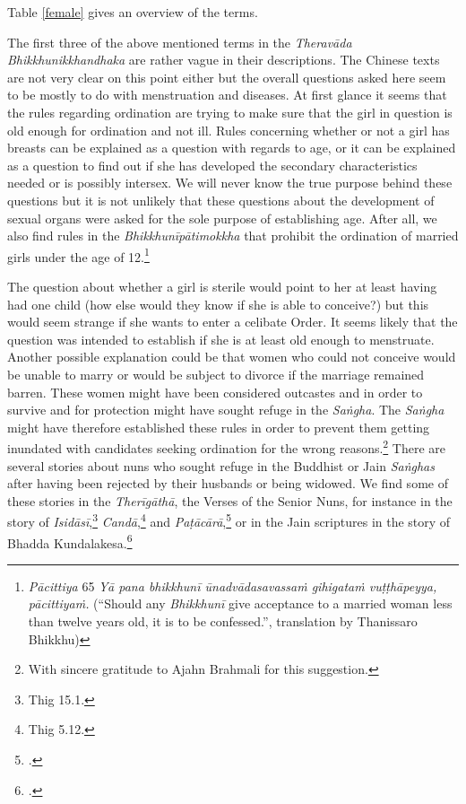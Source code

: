 Table \ref{female} gives an overview of the terms.

The first three of the above mentioned terms in the \textit{Theravāda} \textit{Bhikkhunikkhandhaka} are rather vague in their descriptions. The Chinese texts are not very clear on this point either but the overall questions asked here seem to be mostly to do with menstruation and diseases. At first glance it seems that the rules regarding ordination are trying to make sure that the girl in question is old enough for ordination and not ill. Rules concerning whether or not a girl has breasts can be explained as a question with regards to age, or it can be explained as a question to find out if she has developed the secondary characteristics needed or is possibly intersex. We will never know the true purpose behind these questions but it is not unlikely that these questions about the development of sexual organs were asked for the sole purpose of establishing age. After all, we also find rules in the \textit{Bhikkhunīpātimokkha} that prohibit the ordination of married girls under the age of 12.\footnote{\textit{Pācittiya} 65 \textit{Yā pana bhikkhunī ūnad­vāda­sa­vassaṁ gihigataṁ vuṭṭhāpeyya, pācittiyaṁ.} (``Should any \textit{Bhikkhunī} give acceptance to a married woman less than twelve years old, it is to be confessed.'', translation by Thanissaro Bhikkhu)} 

The question about whether a girl is sterile would point to her at least having had one child (how else would they know if she is able to conceive?) but this would seem strange if she wants to enter a celibate Order. It seems likely that the question was intended to establish if she is at least old enough to menstruate. Another possible explanation could be that women who could not conceive would be unable to marry or would be subject to divorce if the marriage remained barren. These women might have been considered outcastes and in order to survive and for protection might have sought refuge in the \textit{Saṅgha}. The \textit{Saṅgha} might have therefore established these rules in order to prevent them getting inundated with candidates seeking ordination for the wrong reasons.\footnote{With sincere gratitude to Ajahn Brahmali for this suggestion.} There are several stories about nuns who sought refuge in the Buddhist or Jain \textit{Saṅghas} after having been rejected by their husbands or being widowed. We find some of these stories in the \textit{Therīgāthā}, the Verses of the Senior Nuns, for instance in the story of \textit{Isidāsī},\footnote{Thig 15.1.} \textit{Candā},\footnote{Thig 5.12.} and \textit{Paṭācārā},\footnote{\cite{hecker}.} or in the Jain scriptures in the story of Bhadda Kundalakesa.\footnote{\cite{hecker}.}

